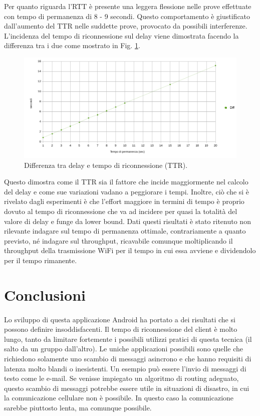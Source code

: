\documentclass{llncs}
\begin{document}
\noindent
Per quanto riguarda l'RTT è presente una leggera flessione nelle prove effettuate con tempo di permanenza di 8 - 9 secondi. Questo comportamento è giustificato dall'aumento del TTR nelle suddette prove, provocato da possibili interferenze. L'incidenza del tempo di riconnessione sul delay viene  dimostrata facendo la differenza tra i due come mostrato in Fig. \ref{diff}.
\begin{figure}[H]
	\includegraphics[scale=0.5,center]{img/diff.png}
	\caption{Differenza tra delay e tempo di riconnessione (TTR).}
	\label{diff}
\end{figure}
\noindent
Questo dimostra come il TTR sia il fattore che incide maggiormente nel calcolo del delay e come sue variazioni vadano a peggiorare i tempi.
Inoltre, ciò che si è rivelato dagli esperimenti è che l'effort maggiore in termini di tempo è proprio dovuto al tempo di riconnessione che va ad incidere per quasi la totalità del valore di delay e funge da lower bound. Dati questi risultati è stato ritenuto non rilevante indagare sul tempo di permanenza ottimale, contrariamente a quanto previsto, né indagare sul throughput, ricavabile comunque moltiplicando il throughput della trasmissione WiFi per il tempo in cui essa avviene e dividendolo per il tempo rimanente.

	
\section{Conclusioni}
\paragraph{} Lo sviluppo di questa applicazione Android ha portato a dei risultati che si possono definire insoddisfacenti. Il tempo di riconnessione del client è molto lungo, tanto da limitare fortemente i possibili utilizzi pratici di questa tecnica
(il salto da un gruppo dall'altro). Le uniche applicazioni possibili sono quelle che richiedono solamente uno scambio di messaggi asincrono e che hanno requisiti di latenza molto blandi o inesistenti. Un esempio può essere l'invio di messaggi di testo come le e-mail. Se venisse impiegato un algoritmo di routing adeguato, questo scambio di messaggi potrebbe essere utile in situazioni di disastro, in cui la comunicazione cellulare non è possibile. In questo caso la comunicazione sarebbe piuttosto lenta, ma comunque possibile.
\end{document}
